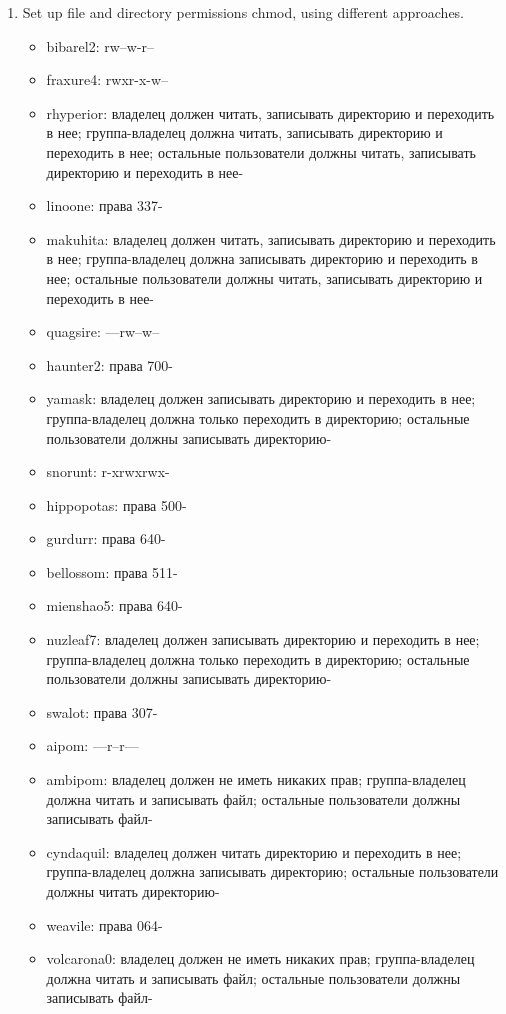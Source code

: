 \documentclass[11pt]{article}
\begin{document}
\begin{enumerate}
\item Set up file and directory permissions chmod, using different approaches.
\begin{itemize}
\item bibarel2: rw--w-r--
\item fraxure4: rwxr-x-w--
\item rhyperior: владелец должен читать, записывать директорию и переходить в нее; группа-владелец должна читать, записывать директорию и переходить в нее; остальные пользователи должны читать, записывать директорию и переходить в нее-
\item linoone: права 337-
\item makuhita: владелец должен читать, записывать директорию и переходить в нее; группа-владелец должна записывать директорию и переходить в нее; остальные пользователи должны читать, записывать директорию и переходить в нее-
\item quagsire: ---rw--w--
\item haunter2: права 700-
\item yamask: владелец должен записывать директорию и переходить в нее; группа-владелец должна только переходить в директорию; остальные пользователи должны записывать директорию-
\item snorunt: r-xrwxrwx-
\item hippopotas: права 500-
\item gurdurr: права 640-
\item bellossom: права 511-
\item mienshao5: права 640-
\item nuzleaf7: владелец должен записывать директорию и переходить в нее; группа-владелец должна только переходить в директорию; остальные пользователи должны записывать директорию-
\item swalot: права 307-
\item aipom: ---r--r---
\item ambipom: владелец должен не иметь никаких прав; группа-владелец должна читать и записывать файл; остальные пользователи должны записывать файл-
\item cyndaquil: владелец должен читать директорию и переходить в нее; группа-владелец должна записывать директорию; остальные пользователи должны читать директорию-
\item weavile: права 064-
\item volcarona0: владелец должен не иметь никаких прав; группа-владелец должна читать и записывать файл; остальные пользователи должны записывать файл-

\end{itemize}
\end{enumerate}
\end{document}
